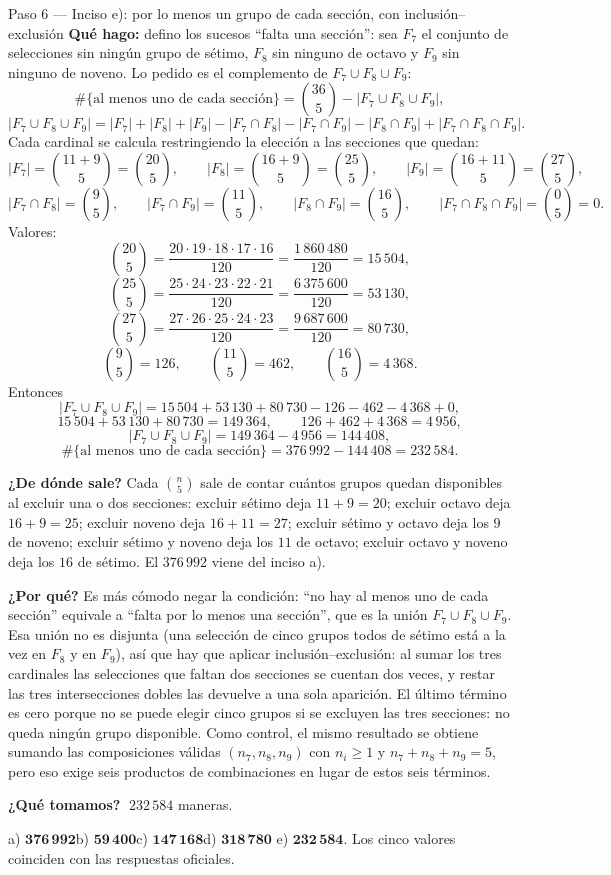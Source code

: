 \documentclass[11pt]{article}
\begin{document}
\begin{paso}{Paso 6 --- Inciso e): por lo menos un grupo de cada sección, con inclusión--exclusión}
\textbf{Qué hago:} defino los sucesos ``falta una sección'': sea $F_7$ el conjunto de selecciones sin
ningún grupo de sétimo, $F_8$ sin ninguno de octavo y $F_9$ sin ninguno de noveno. Lo pedido es el
complemento de $F_7\cup F_8\cup F_9$:
\[
\#\{\text{al menos uno de cada sección}\}=\binom{36}{5}-|F_7\cup F_8\cup F_9| ,
\]
\[
|F_7\cup F_8\cup F_9|=|F_7|+|F_8|+|F_9|-|F_7\cap F_8|-|F_7\cap F_9|-|F_8\cap F_9|+|F_7\cap F_8\cap F_9| .
\]
Cada cardinal se calcula restringiendo la elección a las secciones que quedan:
\[
|F_7|=\binom{11+9}{5}=\binom{20}{5},\qquad |F_8|=\binom{16+9}{5}=\binom{25}{5},\qquad |F_9|=\binom{16+11}{5}=\binom{27}{5},
\]
\[
|F_7\cap F_8|=\binom{9}{5},\qquad |F_7\cap F_9|=\binom{11}{5},\qquad |F_8\cap F_9|=\binom{16}{5},\qquad
|F_7\cap F_8\cap F_9|=\binom{0}{5}=0 .
\]
Valores:
\[
\binom{20}{5}=\frac{20\cdot19\cdot18\cdot17\cdot16}{120}=\frac{1\,860\,480}{120}=15\,504,
\]
\[
\binom{25}{5}=\frac{25\cdot24\cdot23\cdot22\cdot21}{120}=\frac{6\,375\,600}{120}=53\,130,
\]
\[
\binom{27}{5}=\frac{27\cdot26\cdot25\cdot24\cdot23}{120}=\frac{9\,687\,600}{120}=80\,730,
\]
\[
\binom{9}{5}=126,\qquad \binom{11}{5}=462,\qquad \binom{16}{5}=4\,368 .
\]
Entonces
\[
|F_7\cup F_8\cup F_9|=15\,504+53\,130+80\,730-126-462-4\,368+0 ,
\]
\[
15\,504+53\,130+80\,730=149\,364,\qquad 126+462+4\,368=4\,956,
\]
\[
|F_7\cup F_8\cup F_9|=149\,364-4\,956=144\,408 ,
\]
\[
\#\{\text{al menos uno de cada sección}\}=376\,992-144\,408=232\,584 .
\]

\textbf{¿De dónde sale?} Cada $\binom{n}{5}$ sale de contar cuántos grupos quedan disponibles al excluir
una o dos secciones: excluir sétimo deja $11+9=20$; excluir octavo deja $16+9=25$; excluir noveno deja
$16+11=27$; excluir sétimo y octavo deja los $9$ de noveno; excluir sétimo y noveno deja los $11$ de
octavo; excluir octavo y noveno deja los $16$ de sétimo. El $376\,992$ viene del inciso a).

\textbf{¿Por qué?} Es más cómodo negar la condición: ``no hay al menos uno de cada sección'' equivale a
``falta por lo menos una sección'', que es la unión $F_7\cup F_8\cup F_9$. Esa unión no es disjunta (una
selección de cinco grupos todos de sétimo está a la vez en $F_8$ y en $F_9$), así que hay que aplicar
inclusión--exclusión: al sumar los tres cardinales las selecciones que faltan dos secciones se cuentan dos
veces, y restar las tres intersecciones dobles las devuelve a una sola aparición. El último término es cero
porque no se puede elegir cinco grupos si se excluyen las tres secciones: no queda ningún grupo
disponible. Como control, el mismo resultado se obtiene sumando las composiciones válidas
$(n_7,n_8,n_9)$ con $n_i\geq1$ y $n_7+n_8+n_9=5$, pero eso exige seis productos de combinaciones en lugar
de estos seis términos.

\textbf{¿Qué tomamos?} $\;232\,584$ maneras.
\end{paso}

\begin{resp}
a) $\mathbf{376\,992}$\quad b) $\mathbf{59\,400}$\quad c) $\mathbf{147\,168}$\quad d) $\mathbf{318\,780}$\quad
e) $\mathbf{232\,584}$. Los cinco valores coinciden con las respuestas oficiales.
\end{resp}
\end{document}
